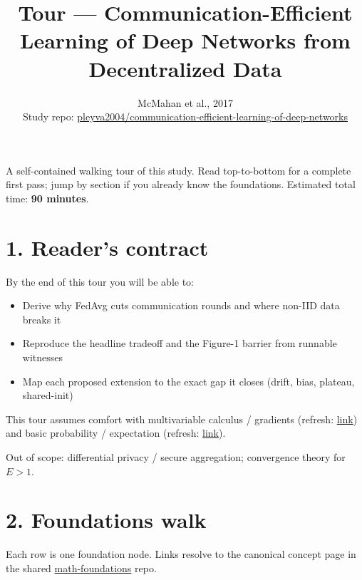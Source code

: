 \documentclass[11pt]{article}
\title{Tour --- Communication-Efficient Learning of Deep Networks from Decentralized Data}
\author{ McMahan et al., 2017 \\ \small Study repo: \href{ https://github.com/pleyva2004/communication-efficient-learning-of-deep-networks }{ pleyva2004/communication-efficient-learning-of-deep-networks } }
\date{}
\begin{document}
\maketitle

\noindent
A self-contained walking tour of this study. Read top-to-bottom for a complete first pass; jump by section if you already know the foundations. Estimated total time: \textbf{ 90 minutes}.

\section*{1. Reader's contract}

By the end of this tour you will be able to:
\begin{itemize}[leftmargin=*]
  \item Derive why FedAvg cuts communication rounds and where non-IID data breaks it
  \item Reproduce the headline tradeoff and the Figure-1 barrier from runnable witnesses
  \item Map each proposed extension to the exact gap it closes (drift, bias, plateau, shared-init)
\end{itemize}

\noindent
This tour assumes comfort with multivariable calculus / gradients (refresh: \href{ https://github.com/pleyva2004/math-foundations/blob/main/concepts/gradient.md }{link}) and basic probability / expectation (refresh: \href{ https://github.com/pleyva2004/math-foundations/blob/main/concepts/expectation.md }{link}).

\noindent
Out of scope: differential privacy / secure aggregation; convergence theory for $E>1$.

\section*{2. Foundations walk}

Each row is one foundation node. Links resolve to the canonical concept page in the shared \href{https://github.com/pleyva2004/math-foundations}{math-foundations} repo.
\end{document}
